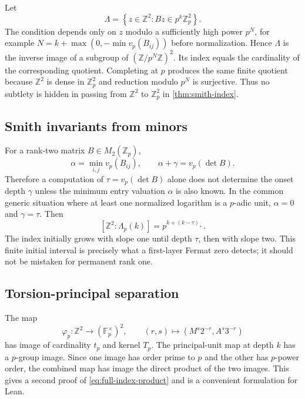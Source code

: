 \documentclass[11pt,oneside]{article}
\theoremstyle{definition}
\newcommand{\Z}{\mathbb{Z}}
\newcommand{\F}{\mathbb{F}}
\newcommand{\set}[1]{\left\{#1\right\}}
\begin{document}
Let
\begin{equation}\label{eq:Z-lattice-condition}
  \Lambda=\set{z\in\Z^2:Bz\in p^k\Z_p^2}.
\end{equation}
The condition depends only on $z$ modulo a sufficiently high power $p^N$,
for example $N=k+\max(0,-\min v_p(B_{ij}))$ before normalization.  Hence
$\Lambda$ is the inverse image of a subgroup of $(\Z/p^N\Z)^2$.  Its
index equals the cardinality of the corresponding quotient.  Completing
at $p$ produces the same finite quotient because $\Z^2$ is dense in
$\Z_p^2$ and reduction modulo $p^N$ is surjective.  Thus no subtlety is
hidden in passing from $\Z^2$ to $\Z_p^2$ in
\cref{thm:smith-index}.

\subsection{Smith invariants from minors}

For a rank-two matrix $B\in M_2(\Z_p)$,
\begin{equation}\label{eq:smith-minors}
  \alpha=\min_{i,j}v_p(B_{ij}),
  \qquad
  \alpha+\gamma=v_p(\det B).
\end{equation}
Therefore a computation of $\tau=v_p(\det B)$ alone does not determine the
onset depth $\gamma$ unless the minimum entry valuation $\alpha$ is also
known.  In the common generic situation where at least one normalized
logarithm is a $p$-adic unit, $\alpha=0$ and $\gamma=\tau$.  Then
\begin{equation}\label{eq:index-alpha0}
  [\Z^2:\Lambda_p(k)]
  =p^{k+(k-\tau)_+}.
\end{equation}
The index initially grows with slope one until depth $\tau$, then with
slope two.  This finite initial interval is precisely what a
first-layer Fermat zero detects; it should not be mistaken for permanent
rank one.

\subsection{Torsion-principal separation}

The map
\begin{equation}\label{eq:residue-map}
  \varphi_p:\Z^2\to(\F_p^\times)^2,
  \qquad
  (r,s)\mapsto(M^s2^{-r},A^s3^{-r})
\end{equation}
has image of cardinality $t_p$ and kernel $T_p$.  The principal-unit map
at depth $k$ has a $p$-group image.  Since one image has order prime to
$p$ and the other has $p$-power order, the combined map has image the
direct product of the two images.  This gives a second proof of
\eqref{eq:full-index-product} and is a convenient formulation for Lean.
\end{document}
